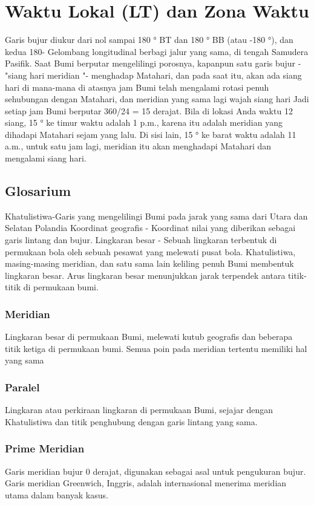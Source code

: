 \section{Waktu Lokal (LT) dan Zona Waktu}
	Garis bujur diukur dari nol sampai 180 ° BT dan 180 ° BB (atau -180 °), dan kedua 180-
	Gelombang longitudinal berbagi jalur yang sama, di tengah Samudera Pasifik.
	Saat Bumi berputar mengelilingi porosnya, kapanpun satu garis bujur - "siang hari
	meridian "- menghadap Matahari, dan pada saat itu, akan ada siang hari di mana-mana di atasnya
	jam Bumi telah mengalami rotasi penuh sehubungan dengan Matahari, dan meridian yang sama
	lagi wajah siang hari Jadi setiap jam Bumi berputar 360/24 = 15 derajat.
	Bila di lokasi Anda waktu 12 siang, 15 ° ke timur waktu adalah 1 p.m., karena itu adalah
	meridian yang dihadapi Matahari sejam yang lalu. Di sisi lain, 15 ° ke barat waktu adalah 11
	a.m., untuk satu jam lagi, meridian itu akan menghadapi Matahari dan mengalami siang hari.

\subsection{Glosarium}
	Khatulistiwa-Garis yang mengelilingi Bumi pada jarak yang sama dari Utara dan Selatan
	Polandia Koordinat geografis - Koordinat nilai yang diberikan sebagai garis lintang dan bujur.
	Lingkaran besar - Sebuah lingkaran terbentuk di permukaan bola oleh sebuah pesawat yang melewati
	pusat bola. Khatulistiwa, masing-masing meridian, dan satu sama lain keliling penuh
	Bumi membentuk lingkaran besar. Arus lingkaran besar menunjukkan jarak terpendek antara titik-titik di permukaan bumi.

	\subsubsection{Meridian}
	Lingkaran besar di permukaan Bumi, melewati kutub geografis
	dan beberapa titik ketiga di permukaan bumi. Semua poin pada meridian tertentu memiliki hal yang sama
	\subsubsection{Paralel}
	Lingkaran atau perkiraan lingkaran di permukaan Bumi, sejajar dengan
	Khatulistiwa dan titik penghubung dengan garis lintang yang sama.
	\subsubsection{Prime Meridian}
	Garis meridian bujur 0 derajat, digunakan sebagai asal untuk
	pengukuran bujur. Garis meridian Greenwich, Inggris, adalah internasional
	menerima meridian utama dalam banyak kasus.

